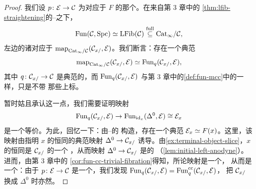 \begin{proof}
我们设 $p\colon \mathcal{E} \to \mathcal{C}$ 为对应于\trFunctor{} $F$ 的那个\trLeftFibration{}。在来自第 3 章中的%
\cref{thm:lfib-straightening}的\trStraightening{}--\trUnstraightening{}\trEquivalence{}之下，
\[
\mathrm{Fun}(\mathcal{C}, \mathrm{Spc}) \simeq
  \mathrm{LFib}(\mathcal{C}) \overset{\mathrm{full}}{\subseteq} \mathrm{Cat}_{\infty}/\mathcal{C},
\]
左边的诸\trMappingSpace{}对应于
$\mathrm{map}_{\mathrm{Cat}_{\infty}/\mathcal{C}}(\mathcal{C}_{x/}, \mathcal{E})$。我们断言：存在一个典范\trEquivalence{}%
\[
\mathrm{map}_{\mathrm{Cat}_{\infty}/\mathcal{C}}(\mathcal{C}_{x/}, \mathcal{E}) \simeq
  \mathrm{Fun}_q(\mathcal{C}_{x/}, \mathcal{E}),
\]
其中 $q\colon \mathcal{C}_{x/} \to \mathcal{C}$ 是典范的\trForgetfulFunctor{}，而
$\mathrm{Fun}_q(\mathcal{C}_{x/}, \mathcal{E})$ 与第 3 章中的\cref{def:fun-mcc}中的一样，只是不带
那些上标。

暂时姑且承认这一点，我们需要证明映射
\[
\mathrm{Fun}_q(\mathcal{C}_{x/}, \mathcal{E}) \to
  \mathrm{Fun}_{\mathrm{id}_x}(\Delta^0, \mathcal{E}) \cong \mathcal{E}_x
\]
是一个等价。为此，回忆一下：由\trStraightening{}--\trUnstraightening{}\trEquivalence{}的
构造，存在一个典范\trEquivalence{} $\mathcal{E}_x \simeq F(x)$。这里，该映射由指明 $x$ 的恒同的典范映射
$\Delta^0 \to \mathcal{C}_{x/}$ 诱导。由\cref{ex:terminal-object-slice}，$x$ 的恒同是 $\mathcal{C}_{x/}$ 的一个%
\trInitialObject{}，从而映射 $\Delta^0 \to \mathcal{C}_{x/}$ 是\trLeftAnodyne{}的
（\cref{lem:initial-left-anodyne}）。进而，由第 3 章中的%
\cref{cor:fun-cc-trivial-fibration}得知，所论映射是一个\trTrivialFibration{}，
从而是一个\trJoyalEquivalence{}：由于 $p\colon \mathcal{E} \to \mathcal{C}$
是一个\trLeftFibration{}，我们发现
$\mathrm{Fun}_q(\mathcal{C}_{x/}, \mathcal{E}) = \mathrm{Fun}^{\mathrm{cc}}_q(\mathcal{C}_{x/}, \mathcal{E})$，
把 $\mathcal{C}_{x/}$ 换成 $\Delta^0$ 时亦然。


\end{proof}
